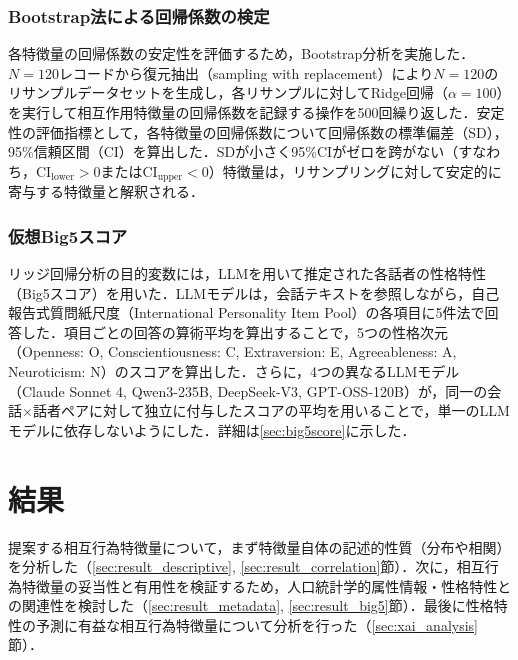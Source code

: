 \documentclass[dvipdfmx,11pt,a4paper]{bxjsarticle}
\renewcommand{\_}{\paperorigunderscore\allowbreak}%
\begin{document}

\subsubsection{Bootstrap法による回帰係数の検定}

各特徴量の回帰係数の安定性を評価するため，Bootstrap分析を実施した．$N = 120$レコードから復元抽出（sampling with replacement）により$N = 120$のリサンプルデータセットを生成し，各リサンプルに対してRidge回帰（$\alpha = 100$）を実行して相互作用特徴量の回帰係数を記録する操作を500回繰り返した．安定性の評価指標として，各特徴量の回帰係数について回帰係数の標準偏差（SD），95\%信頼区間（CI）を算出した．SDが小さく95\%CIがゼロを跨がない（すなわち，$\text{CI}_{\text{lower}} > 0$または$\text{CI}_{\text{upper}} < 0$）特徴量は，リサンプリングに対して安定的に寄与する特徴量と解釈される．


\subsubsection{仮想Big5スコア}
\label{sec:virtual_teacher}


リッジ回帰分析の目的変数には，LLMを用いて推定された各話者の性格特性（Big5スコア）を用いた．LLMモデルは，会話テキストを参照しながら，自己報告式質問紙尺度（International Personality Item Pool）の各項目に5件法で回答した．項目ごとの回答の算術平均を算出することで，5つの性格次元（Openness: O, Conscientiousness: C, Extraversion: E, Agreeableness: A, Neuroticism: N）のスコアを算出した．さらに，4つの異なるLLMモデル（Claude Sonnet 4, Qwen3-235B, DeepSeek-V3, GPT-OSS-120B）が，同一の会話$\times$話者ペアに対して独立に付与したスコアの平均を用いることで，単一のLLMモデルに依存しないようにした．詳細は\ref{sec:big5score}に示した．



\section{結果}
提案する相互行為特徴量について，まず特徴量自体の記述的性質（分布や相関）を分析した（\ref{sec:result_descriptive}, \ref{sec:result_correlation}節）．次に，相互行為特徴量の妥当性と有用性を検証するため，人口統計学的属性情報・性格特性との関連性を検討した（\ref{sec:result_metadata}, \ref{sec:result_big5}節）．最後に性格特性の予測に有益な相互行為特徴量について分析を行った（\ref{sec:xai_analysis}節）．
\end{document}
